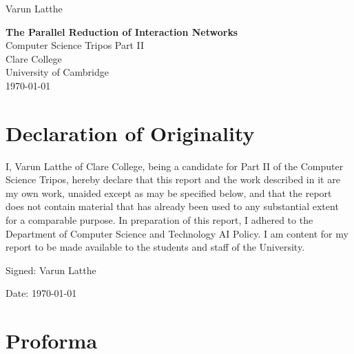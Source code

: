 \documentclass[12pt,a4paper]{report}
\begin{document}
\begin{titlepage}
  \begin{flushright}
    \Large Varun Latthe
  \end{flushright}
  \vspace*{2cm}
  \begin{center}
    \Huge\textbf{The Parallel Reduction of Interaction Networks}\\
    \vspace{1.5cm}
    \Large Computer Science Tripos Part II\\
    \vspace{0.5cm}
    \Large Clare College\\
    \Large University of Cambridge\\
    \vspace{0.5cm}
    \Large \today
  \end{center}
\end{titlepage}

\chapter*{Declaration of Originality}
\thispagestyle{empty}

I, Varun Latthe of Clare College, being a candidate for Part II of the Computer Science Tripos, hereby declare that this report and the work described in it are my own work, unaided except as may be specified below, and that the report does not contain material that has already been used to any substantial extent for a comparable purpose. In preparation of this report, I adhered to the Department of Computer Science and Technology AI Policy. I am content for my report to be made available to the students and staff of the University.

\vspace{1cm}
Signed: Varun Latthe

\vspace{0.5cm}
Date: \today

\newpage

\chapter*{Proforma}
\thispagestyle{empty}
\end{document}
